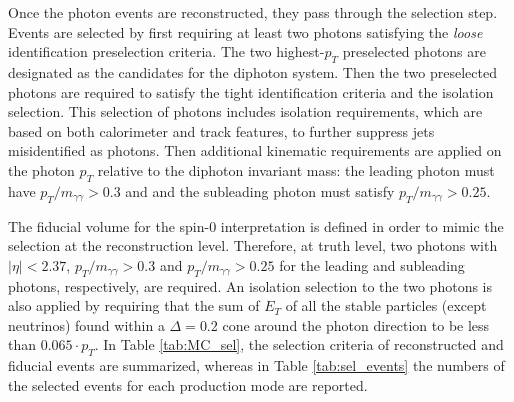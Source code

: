 \documentclass[a4paper, oneside, 11pt, openright]{book}
\begin{document}
 			Once the photon events are reconstructed, they pass through the selection step. Events are selected by first requiring at least two photons satisfying the \textit{loose} identification preselection criteria. The two highest-$p_T$ preselected photons are designated as the candidates for the diphoton system. Then the two preselected photons are required to satisfy the tight identification criteria and the isolation selection. This selection of photons includes isolation requirements, which are based on both calorimeter and track features, to further suppress jets misidentified as photons. Then additional kinematic requirements are applied on the photon $p_T$ relative to the diphoton invariant mass: the leading photon must have $p_T/m_{\gamma\gamma} > 0.3$ and and the subleading photon must satisfy $p_T/m_{\gamma\gamma} > 0.25$.
 			
 			The fiducial volume for the spin-0 interpretation is defined in order to mimic the selection at the reconstruction level. Therefore, at truth level, two photons with $|\eta|<2.37$, $p_T/m_{\gamma\gamma} > 0.3$ and $p_T/m_{\gamma\gamma} > 0.25$ for the leading and subleading photons, respectively, are required. An isolation selection to the two photons is also applied by requiring that the sum of $E_T$ of all the stable particles (except neutrinos) found within a $\Delta = 0.2$ cone around the photon direction to be less than $0.065\cdot p_T$. In Table \ref{tab:MC_sel}, the selection criteria of reconstructed and fiducial events are summarized, whereas in Table \ref{tab:sel_events} the numbers of the selected events for each production mode are reported.
 			
 			
\end{document}
